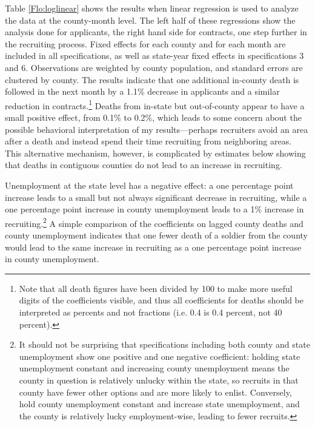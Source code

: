 \documentclass[12pt] {article}
\begin{document}
Table \ref{Flo:loglinear}
shows the results when linear regression is used to analyze the data
at the county-month level. The left half of these regressions show the analysis done for applicants, the right hand side for contracts, one step further in the recruiting
process. %
Fixed effects for each county and for each month are included in all specifications, as well as state-year fixed effects  in specifications 3 and 6.
Observations are weighted by county population, and standard errors
are clustered by county. The results indicate that one additional
in-county death is followed in the next month by a 1.1\%
decrease in applicants and a similar reduction in contracts.\footnote{Note that all death figures have been divided by 100 to make more
useful digits of the coefficients visible, and thus all coefficients
for deaths should be interpreted as percents and not fractions (i.e.
0.4 is 0.4 percent, not 40 percent).} Deaths from in-state but out-of-county
appear to have a small positive effect, from 0.1\% to 0.2\%, which leads to some concern about the possible behavioral interpretation of my results---perhaps recruiters avoid an area after a death and instead spend their time recruiting from neighboring areas. This alternative mechanism, however, is complicated by estimates below showing that deaths in contiguous counties do not lead to an increase in recruiting. 

Unemployment at the state level has a negative effect: a one percentage point increase leads to a small but not always significant decrease in recruiting,
while a one percentage point increase in county unemployment leads
to a 1\% increase in recruiting.\footnote{It should not be surprising that specifications including both county and state unemployment show one positive and one negative coefficient: holding state unemployment constant and increasing county unemployment means the county in question is relatively unlucky within the state, so recruits in that county have fewer other options and are more likely to enlist. Conversely, hold county unemployment constant and increase state unemployment, and the county is relatively lucky employment-wise, leading to fewer recruits.}  A simple comparison of the coefficients on lagged county deaths and county unemployment indicates that one fewer death of a soldier from the county would lead to the same increase in recruiting as a one percentage point increase in county unemployment.
\end{document}
